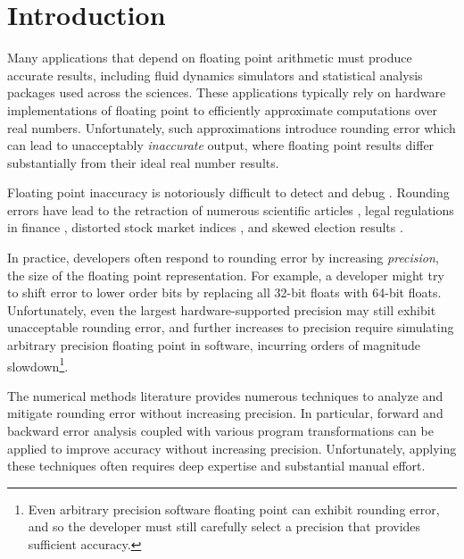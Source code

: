 \documentclass[paper.tex]{subfiles}
\begin{document}
\section{Introduction}
\label{sec:introduction}

Many applications that depend on floating point arithmetic must
produce accurate results, including fluid dynamics simulators and
statistical analysis packages used across the sciences.  These
applications typically rely on hardware implementations of floating
point to efficiently approximate computations over real numbers.
Unfortunately, such approximations introduce rounding error which can
lead to unacceptably \textit{inaccurate} output, where floating point
results differ substantially from their ideal real number results.


Floating point inaccuracy is notoriously difficult to detect and debug
.  Rounding errors have lead to the retraction of
numerous scientific articles , legal regulations in finance
, distorted stock market indices , and skewed
election results .

In practice, developers often respond to rounding error by increasing
\textit{precision}, the size of the floating point representation.
For example, a developer might try to shift error to lower order bits
by replacing all 32-bit floats with 64-bit floats.  Unfortunately,
even the largest hardware-supported precision may still exhibit
unacceptable rounding error, and further increases to precision
require simulating arbitrary precision floating point in software,
incurring orders of magnitude slowdown\footnote{Even arbitrary
  precision software floating point can exhibit rounding error, and so
  the developer must still carefully select a precision that provides
  sufficient accuracy.}.

 The numerical methods literature provides numerous
techniques to analyze and mitigate rounding error without increasing
precision.  In
particular, forward and backward error analysis  coupled
with various program transformations  can be applied to
improve accuracy without increasing precision.  Unfortunately,
applying these techniques often requires deep expertise and
substantial manual effort.
\end{document}
